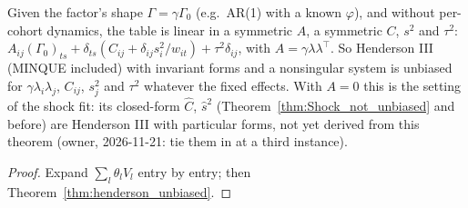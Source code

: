 \begin{theorem}\label{thm:Factor_henderson}
  \leanok
  Given the factor's shape $\Gamma = \gamma\Gamma_0$ (e.g.\ AR(1) with a known $\varphi$), and
  without per-cohort dynamics, the table is linear in a symmetric $A$, a symmetric $C$, $s^2$
  and $\tau^2$:
  $A_{ij}(\Gamma_0)_{ts} + \delta_{ts}(C_{ij} + \delta_{ij}s_i^2/w_{it}) + \tau^2\delta_{ij}$,
  with $A = \gamma\lambda\lambda^\top$. So Henderson III (MINQUE included) with invariant forms
  and a nonsingular system is unbiased for $\gamma\lambda_i\lambda_j$, $C_{ij}$, $s_j^2$ and
  $\tau^2$ whatever the fixed effects. With $A = 0$ this is the setting of the shock fit: its closed-form $\hat C$, $\hat s^2$
  (Theorem~\ref{thm:Shock_not_unbiased} and before) are Henderson III with particular forms, not
  yet derived from this theorem (owner, 2026-11-21: tie them in at a third instance).
\end{theorem}
\begin{proof}
  \leanok
  Expand $\sum_l\theta_lV_l$ entry by entry; then Theorem~\ref{thm:henderson_unbiased}.
\end{proof}

